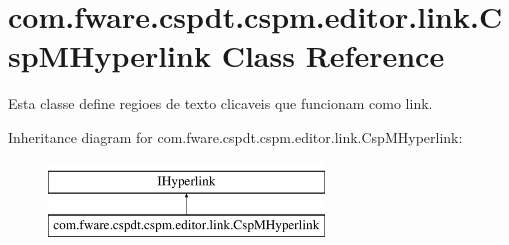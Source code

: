 \hypertarget{classcom_1_1fware_1_1cspdt_1_1cspm_1_1editor_1_1link_1_1_csp_m_hyperlink}{}\section{com.\+fware.\+cspdt.\+cspm.\+editor.\+link.\+Csp\+M\+Hyperlink Class Reference}
\label{classcom_1_1fware_1_1cspdt_1_1cspm_1_1editor_1_1link_1_1_csp_m_hyperlink}


Esta classe define regioes de texto clicaveis que funcionam como link.  


Inheritance diagram for com.\+fware.\+cspdt.\+cspm.\+editor.\+link.\+Csp\+M\+Hyperlink\+:\begin{figure}[H]
\begin{center}
\leavevmode
\includegraphics[height=2.000000cm]{classcom_1_1fware_1_1cspdt_1_1cspm_1_1editor_1_1link_1_1_csp_m_hyperlink}
\end{center}
\end{figure}
